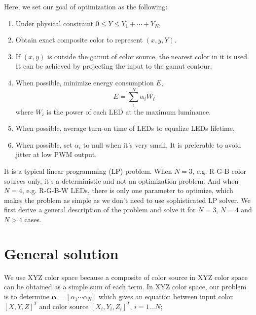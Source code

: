 \documentclass[dvipdfmx,a4paper]{article}
\begin{document}
Here, we set our goal of optimization as the following:
\begin{enumerate}
  \item\label{I_max_luminance} Under physical constraint $0 \leq Y \leq  Y_1 + \cdots + Y_N$,
  \item\label{I_solution} Obtain exact composite color to represent $(x, y, Y)$.
  \item\label{I_inside_gamut} If $(x, y)$ is outside the gamut of color source, the nearest color in it is used.
  It can be achieved by projecting the input to the gamut contour.
  \item\label{I_min_energy} When possible, minimize energy consumption $E$, \\
  \begin{equation}
    \label{E_min_energy}
    E = \sum_1^N \alpha_i W_i
  \end{equation}
  where $W_i$ is the power of each LED at the maximum luminance.
  \item\label{I_lifetime} When possible, average turn-on time of LEDs to equalize LEDs lifetime,
  \item\label{I_small_alpha} When possible, set $\alpha_i$ to null when it's very small.
  It is preferable to avoid jitter at low PWM output.
\end{enumerate}

It is a typical linear programming (LP) problem. When $N=3$, e.g. R-G-B color sources only, it's a deterministic and not an optimization problem. And when $N=4$, e.g. R-G-B-W LEDs, there is only one parameter to optimize, which makes the problem as simple as we don't need to use sophisticated LP solver.
We first derive a general description of the problem and solve it for $N=3$, $N=4$ and $N > 4$ cases.

\section{General solution}
We use XYZ color space because a composite of color source in XYZ color space can be obtained as a simple sum of each term.  In XYZ color space, our problem is to determine $\boldsymbol{\alpha} = [\alpha_1 \cdots \alpha_N]$ which gives an equation between input color $[X, Y, Z]^T$ and color source $[X_{i}, Y_{i}, Z_{i}]^T$, $i=1 \ldots N$;
\end{document}
